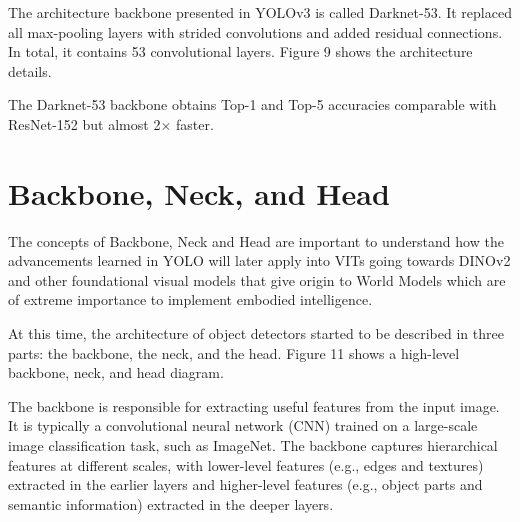 \documentclass{article}
\begin{document}
The architecture backbone presented in YOLOv3 is called Darknet-53. It replaced all max-pooling layers with strided convolutions and added residual connections. In total, it contains 53 convolutional layers. Figure 9 shows the architecture details.

The Darknet-53 backbone obtains Top-1 and Top-5 accuracies comparable with ResNet-152 but almost 2× faster.



\section{Backbone, Neck, and Head}

The concepts of Backbone, Neck and Head are important to understand how the advancements learned in YOLO will later apply into VITs going towards DINOv2 and other foundational visual models that give origin to World Models which are of extreme importance to implement embodied intelligence.


At this time, the architecture of object detectors started to be described in three parts: the backbone, the neck, and the head. Figure 11 shows a high-level backbone, neck, and head diagram.

The backbone is responsible for extracting useful features from the input image. It is typically a convolutional neural network (CNN) trained on a large-scale image classification task, such as ImageNet. The backbone captures hierarchical features at different scales, with lower-level features (e.g., edges and textures) extracted in the earlier layers and higher-level features (e.g., object parts and semantic information) extracted in the deeper layers.
\end{document}
